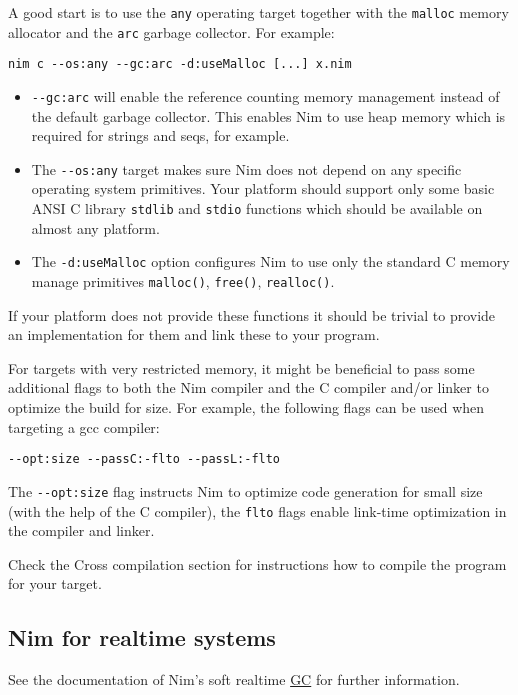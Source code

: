 A good start is to use the \texttt{any} operating target together with
the \texttt{malloc} memory allocator and the \texttt{arc} garbage
collector. For example:

\texttt{nim\ c\ -\/-os:any\ -\/-gc:arc\ -d:useMalloc\ {[}...{]}\ x.nim}

\begin{itemize}
\tightlist
\item
  \texttt{-\/-gc:arc} will enable the reference counting memory
  management instead of the default garbage collector. This enables Nim
  to use heap memory which is required for strings and seqs, for
  example.
\item
  The \texttt{-\/-os:any} target makes sure Nim does not depend on any
  specific operating system primitives. Your platform should support
  only some basic ANSI C library \texttt{stdlib} and \texttt{stdio}
  functions which should be available on almost any platform.
\item
  The \texttt{-d:useMalloc} option configures Nim to use only the
  standard C memory manage primitives \texttt{malloc()},
  \texttt{free()}, \texttt{realloc()}.
\end{itemize}

If your platform does not provide these functions it should be trivial
to provide an implementation for them and link these to your program.

For targets with very restricted memory, it might be beneficial to pass
some additional flags to both the Nim compiler and the C compiler and/or
linker to optimize the build for size. For example, the following flags
can be used when targeting a gcc compiler:

\texttt{-\/-opt:size\ -\/-passC:-flto\ -\/-passL:-flto}

The \texttt{-\/-opt:size} flag instructs Nim to optimize code generation
for small size (with the help of the C compiler), the \texttt{flto}
flags enable link-time optimization in the compiler and linker.

Check the {Cross compilation} section for instructions how to compile
the program for your target.

\hypertarget{nim-for-realtime-systems}{%
\subsection{Nim for realtime systems}\label{nim-for-realtime-systems}}

See the documentation of Nim's soft realtime \href{gc.html}{GC} for
further information.

